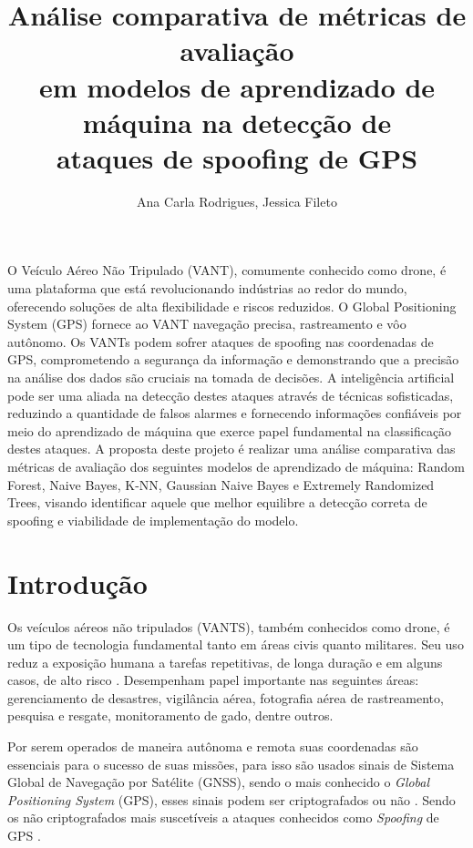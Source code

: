 \documentclass[12pt]{article}
\title{Análise comparativa de métricas de avaliação\\
em modelos de aprendizado de máquina na detecção de\\
ataques de spoofing de GPS
}
\author{Ana Carla Rodrigues\inst{1}, Jessica Fileto\inst{1}}
\begin{document}
\maketitle
     
\begin{resumo} 
O Veículo Aéreo Não Tripulado (VANT), comumente conhecido como drone, é uma
plataforma que está revolucionando indústrias ao redor do mundo, oferecendo 
soluções de alta flexibilidade e riscos reduzidos. O Global Positioning System 
(GPS) fornece ao VANT navegação precisa, rastreamento e vôo autônomo. Os VANTs 
podem sofrer ataques de spoofing nas coordenadas de GPS, comprometendo a 
segurança da informação e demonstrando que a precisão na análise dos dados são 
cruciais na tomada de decisões. A inteligência artificial pode ser uma aliada 
na detecção destes ataques através de técnicas sofisticadas, reduzindo a 
quantidade de falsos alarmes e fornecendo informações confiáveis por meio do 
aprendizado de máquina que exerce papel fundamental na classificação destes 
ataques. A proposta deste projeto é realizar uma análise comparativa das 
métricas de avaliação dos seguintes modelos de aprendizado de máquina: Random 
Forest, Naive Bayes, K-NN, Gaussian Naive Bayes e Extremely Randomized Trees, visando identificar 
aquele que melhor equilibre a detecção correta de spoofing e viabilidade de 
implementação do modelo.
\end{resumo}

\section{Introdução}

\begin{comment}
  Introdução, Fundamentação teórica/Trabalhos
  relacionados, Proposta, Metodologia experimental, Resultados e discussão,
  Conclusão, Referências; 
\end{comment}
Os veículos aéreos não tripulados (VANTS), também conhecidos como drone,
é um tipo de tecnologia fundamental tanto em áreas civis quanto militares.
Seu uso reduz a exposição humana a tarefas repetitivas, de longa duração e em alguns casos, de alto risco \cite{dialogos}.
Desempenham papel importante nas seguintes áreas: gerenciamento de desastres, vigilância aérea, fotografia aérea de rastreamento, pesquisa e resgate,
monitoramento de gado, dentre outros. \cite{titounaLightweightSecurityTechnique2021} 

Por serem operados de maneira autônoma e remota suas coordenadas são essenciais
para o sucesso de suas missões, para isso são usados sinais de Sistema Global de Navegação por Satélite (GNSS),
sendo o mais conhecido o \textit{Global Positioning System} (GPS), esses sinais podem ser criptografados ou não
\cite {lester}. Sendo os não criptografados mais suscetíveis a ataques conhecidos como \textit{Spoofing} de GPS \cite{srinivasansGPSSpoofingDetection2023}. 
\end{document}
